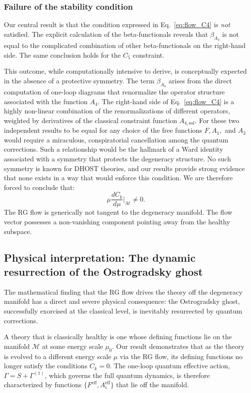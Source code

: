 \documentclass[twocolumn]{aastex631}
\begin{document}
\subsubsection{Failure of the stability condition}

Our central result is that the condition expressed in Eq.~\eqref{eq:flow_C4} is \textit{not} satisfied. The explicit calculation of the beta-functionals reveals that $\beta_{A_4}$ is not equal to the complicated combination of other beta-functionals on the right-hand side. The same conclusion holds for the $C_5$ constraint.

This outcome, while computationally intensive to derive, is conceptually expected in the absence of a protective symmetry. The term $\beta_{A_4}$ arises from the direct computation of one-loop diagrams that renormalize the operator structure associated with the function $A_4$. The right-hand side of Eq.~\eqref{eq:flow_C4} is a highly non-linear combination of the renormalizations of different operators, weighted by derivatives of the classical constraint function $A_{4,\text{sol}}$. For these two independent results to be equal for any choice of the free functions $F, A_1,$ and $A_3$ would require a miraculous, conspiratorial cancellation among the quantum corrections. Such a relationship would be the hallmark of a Ward identity associated with a symmetry that protects the degeneracy structure. No such symmetry is known for DHOST theories, and our results provide strong evidence that none exists in a way that would enforce this condition. We are therefore forced to conclude that:
\begin{equation}
    \mu \frac{dC_k}{d\mu} \bigg|_{\mathcal{M}} \neq 0.
\end{equation}
The RG flow is generically not tangent to the degeneracy manifold. The flow vector possesses a non-vanishing component pointing away from the healthy subspace.

\subsection{Physical interpretation: The dynamic resurrection of the Ostrogradsky ghost}

The mathematical finding that the RG flow drives the theory off the degeneracy manifold has a direct and severe physical consequence: the Ostrogradsky ghost, successfully exorcised at the classical level, is inevitably resurrected by quantum corrections.

A theory that is classically healthy is one whose defining functions lie on the manifold $\mathcal{M}$ at some energy scale $\mu_0$. Our result demonstrates that as the theory is evolved to a different energy scale $\mu$ via the RG flow, its defining functions no longer satisfy the conditions $C_k=0$. The one-loop quantum effective action, $\Gamma = S + \Gamma^{(1)}$, which governs the full quantum dynamics, is therefore characterized by functions $\{F^{\text{eff}}, A_i^{\text{eff}}\}$ that lie off the manifold.
\end{document}
